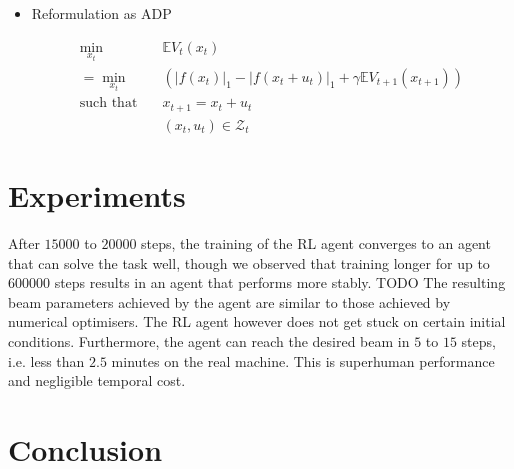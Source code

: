 \begin{itemize}
    
    \item Reformulation as ADP
    
    \begin{align*}
        \min_{x_t} \quad&\mathbb{E} V_t(x_t)\\ = \min_{x_t} \quad& \left(|f(x_t)|_1-|f(x_t+u_t)|_1 +\gamma \mathbb{E} V_{t+1}(x_{t+1}) \right)\\
        \text{such that} \quad &x_{t+1}=x_t+u_t\\
        & (x_t,u_t)\in\mathcal{Z}_t 
    \end{align*}
\end{itemize}

\section{Experiments}

After $\num{15000}$ to $\num{20000}$ steps, the training of the \ac{RL} agent converges to an agent that can solve the task well, though we observed that training longer for up to $\num{600000}$ steps results in an agent that performs more stably. TODO The resulting beam parameters achieved by the agent are similar to those achieved by numerical optimisers. The \ac{RL} agent however does not get stuck on certain initial conditions. Furthermore, the agent can reach the desired beam in $\num{5}$ to $\num{15}$ steps, i.e. less than $\num{2.5}$ minutes on the real machine. This is superhuman performance and negligible temporal cost.

\section{Conclusion}
